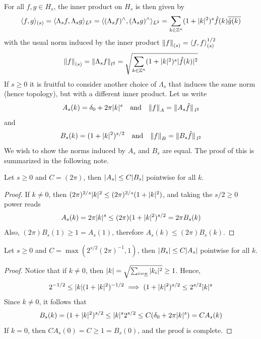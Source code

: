 \documentclass[../main-v2-manifolds.tex]{subfiles}
\begin{document}
For all $f,g\in H_s$, the inner product on $H_s$ is then given by 
\begin{equation}
\langle f,g\rangle_{(s)} = \langle \Lambda_s f,\Lambda_s g\rangle_{L^2} = \langle (\Lambda_s f)^{\wedge},(\Lambda_s g)^\wedge\rangle_{L^2}=\sum_{k\in\mathbb{Z}^n}(1+\vert {k} \vert^2)^{s}\hat{f}(k)\overline{\hat{g}(k)} 
\label{eq: sobolev hs l2 inner product folland}
\end{equation}
with the usual norm induced by the inner product $\norm{f}_{(s)} = \langle f,f\rangle_{(s)}^{1/2}$ 
\begin{equation}
\norm{f}_{(s)}=\norm{\Lambda_s f}_{l^2} =\sqrt{\sum_{k\in\mathbb{Z}^n} (1+\vert {k} \vert^2)^s\vert\hat{f}(k)\vert^2}
\label{eq: sobolev hs l2 norm folland}
\end{equation}
If $s\geq 0$ it is fruitful to consider another choice of $\Lambda_s$ that induces the same norm (hence topology), but with a different inner product. Let us write 
\begin{equation}
    A_s(k) = \delta_0 + 2\pi \abs{k}^s\qqtext{and} \norm{f}_{A} = \norm*{A_s\hat{f}}_{l^2}
    \label{eq:periodic sobolev spaces As}
\end{equation}
and
\begin{equation}
    B_s(k) = (1+\abs{k}^2)^{s/2}\qqtext{and} \norm{f}_{B} = \norm*{B_s\hat{f}}_{l^2}
    \label{eq:periodic sobolev spaces Bs}
\end{equation}
We wish to show the norms induced by $A_s$ and $B_s$ are equal. The proof of this is summarized in the following note.
\begin{note}
\begin{lemma}
    Let $s\geq 0$ and $C = (2\pi)$, then $\vert {A_s} \vert\leq C\vert {B_s} \vert$ pointwise for all $k$.
\end{lemma}    
\begin{proof}
    If $k\neq 0$, then $(2\pi)^{2/s}\vert {k} \vert^2\leq (2\pi)^{2/s}(1+\vert {k} \vert^2)$, and taking the $s/2\geq 0$ power reads
    \[  
        A_s(k)=2\pi\vert {k} \vert^s\leq (2\pi)(1+\vert {k} \vert^2)^{s/2}=2\pi B_s(k)
    \]
    Also, $(2\pi) B_s(1)\geq 1=A_s(1)$, therefore $A_s(k)\leq (2\pi)B_s(k)$.
\end{proof}
\begin{lemma}
    Let $s\geq 0$ and $C = \max(2^{s/2}(2\pi)^{-1},1)$, then $\vert {B_s} \vert\leq C\vert {A_s} \vert$ pointwise for all $k$.
\end{lemma}
\begin{proof}
    Notice that if $k\neq 0$, then $\vert {k} \vert=\sqrt{\sum_{i=\underline{n}}\vert {k_i} \vert^2} \geq 1$. Hence,
    \[
        2^{-1/2}\leq\vert {k} \vert(1+\vert {k} \vert^2)^{-1/2}\implies (1+\vert {k} \vert^2)^{s/2} \leq 2^{s/2}\vert {k} \vert^s
    \]
    Since $k\neq 0$, it follows that 
    \[
    B_s(k)=(1+\vert {k} \vert^2)^{s/2}\leq \vert {k} \vert^s 2^{s/2}\leq C(\delta_0 + 2\pi\vert {k} \vert^s)= CA_s(k)
    \]
    If $k=0$, then $CA_s(0)=C\geq 1 = B_s(0)$, and the proof is complete.
\end{proof}
\end{note}
\end{document}
